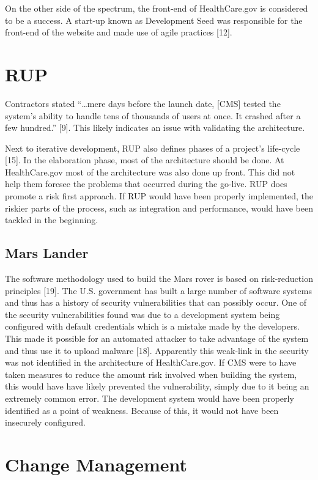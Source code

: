\documentclass[]{article}
\begin{document}
On the other side of the spectrum, the front-end of HealthCare.gov is
considered to be a success. A start-up known as Development Seed was
responsible for the front-end of the website and made use of agile
practices {[}12{]}.

\section{RUP}\label{rup}

Contractors stated ``\ldots{}mere days before the launch date, {[}CMS{]}
tested the system's ability to handle tens of thousands of users at
once. It crashed after a few hundred.'' {[}9{]}. This likely indicates
an issue with validating the architecture.

Next to iterative development, RUP also defines phases of a project's
life-cycle {[}15{]}. In the elaboration phase, most of the architecture
should be done. At HealthCare.gov most of the architecture was also done
up front. This did not help them foresee the problems that occurred
during the go-live. RUP does promote a risk first approach. If RUP would
have been properly implemented, the riskier parts of the process, such
as integration and performance, would have been tackled in the
beginning.

\subsection{Mars Lander}\label{mars-lander-1}

The software methodology used to build the Mars rover is based on
risk-reduction principles {[}19{]}. The U.S. government has built a
large number of software systems and thus has a history of security
vulnerabilities that can possibly occur. One of the security
vulnerabilities found was due to a development system being configured
with default credentials which is a mistake made by the developers. This
made it possible for an automated attacker to take advantage of the
system and thus use it to upload malware {[}18{]}. Apparently this
weak-link in the security was not identified in the architecture of
HealthCare.gov. If CMS were to have taken measures to reduce the amount
risk involved when building the system, this would have have likely
prevented the vulnerability, simply due to it being an extremely common
error. The development system would have been properly identified as a
point of weakness. Because of this, it would not have been insecurely
configured.

\section{Change Management}\label{change-management}
\end{document}
